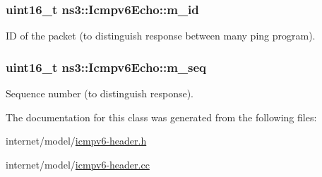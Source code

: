 \subsubsection[{\texorpdfstring{m\+\_\+id}{m_id}}]{\setlength{\rightskip}{0pt plus 5cm}uint16\+\_\+t ns3\+::\+Icmpv6\+Echo\+::m\+\_\+id\hspace{0.3cm}{\ttfamily [private]}}\hypertarget{classns3_1_1Icmpv6Echo_a65f132aeee1a0674b4193c3aa75fdf88}{}\label{classns3_1_1Icmpv6Echo_a65f132aeee1a0674b4193c3aa75fdf88}


ID of the packet (to distinguish response between many ping program). 

\subsubsection[{\texorpdfstring{m\+\_\+seq}{m_seq}}]{\setlength{\rightskip}{0pt plus 5cm}uint16\+\_\+t ns3\+::\+Icmpv6\+Echo\+::m\+\_\+seq\hspace{0.3cm}{\ttfamily [private]}}\hypertarget{classns3_1_1Icmpv6Echo_a1d5d660b22107f2298be06fe63c20caa}{}\label{classns3_1_1Icmpv6Echo_a1d5d660b22107f2298be06fe63c20caa}


Sequence number (to distinguish response). 



The documentation for this class was generated from the following files\+:\begin{DoxyCompactItemize}
\item 
internet/model/\hyperlink{icmpv6-header_8h}{icmpv6-\/header.\+h}\item 
internet/model/\hyperlink{icmpv6-header_8cc}{icmpv6-\/header.\+cc}\end{DoxyCompactItemize}
